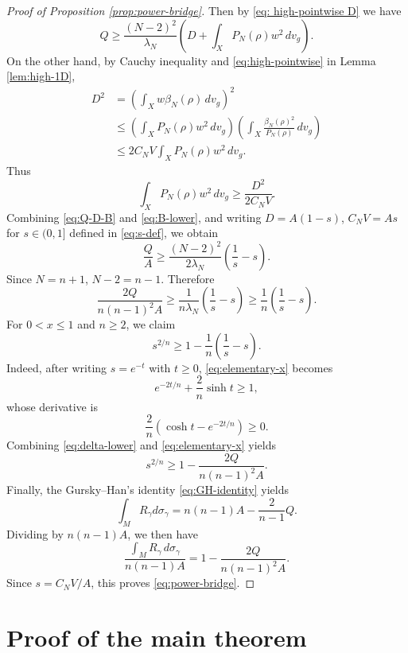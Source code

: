 \documentclass[11pt,letterpaper]{amsart}
\theoremstyle{definition}
\theoremstyle{remark}
\numberwithin{equation}{section}
\begin{document}
\begin{proof}[Proof of Proposition \ref{prop:power-bridge}]
Then by \eqref{eq: high-pointwise D} we have
\begin{equation}\label{eq:Q-D-B}
 Q\ge\frac{(N-2)^2}{\lambda_N}
 \left(D+\int_XP_N(\rho)w^2\,dv_g\right).
\end{equation}
On the other hand, by Cauchy inequality and \eqref{eq:high-pointwise} in Lemma \ref{lem:high-1D},
\begin{align*}
 D^2
 &=\left(\int_Xw\beta_N(\rho)\,dv_g\right)^2\\
 &\le\left(\int_XP_N(\rho)w^2\,dv_g\right)
    \left(\int_X\frac{\beta_N(\rho)^2}{P_N(\rho)}\,dv_g\right)\\
 &\le 2C_NV\int_XP_N(\rho)w^2\,dv_g.
\end{align*}
Thus
\begin{equation}\label{eq:B-lower}
 \int_XP_N(\rho)w^2\,dv_g\ge\frac{D^2}{2C_NV}.
\end{equation}
Combining \eqref{eq:Q-D-B} and \eqref{eq:B-lower}, and writing $D=A(1-s)$, $C_NV=As$ for $s\in (0, 1]$ defined in \eqref{eq:s-def}, we obtain
\begin{equation}\label{eq:Q-lower-x}
 \frac{Q}{A}
 \ge
 \frac{(N-2)^2}{2\lambda_N}\left(\frac1s-s\right).
\end{equation}
Since $N=n+1$, $N-2=n-1$.  Therefore
\begin{equation}\label{eq:delta-lower}
 \frac{2Q}{n(n-1)^2A}
 \ge
 \frac1{n\lambda_N}\left(\frac1s-s\right)
 \ge
 \frac1n\left(\frac1s-s\right).
\end{equation}
For $0<x\le1$ and $n\ge2$, we claim
\begin{equation}\label{eq:elementary-x}
 s^{2/n}\ge1-\frac1n\left(\frac1s-s\right).
\end{equation}
Indeed, after writing $s=e^{-t}$ with $t\geq 0$, \eqref{eq:elementary-x} becomes
\[
 e^{-2t/n}+\frac2n\sinh t\ge1,
\]
whose derivative is 
\[
\frac2n(\cosh t-e^{-2t/n})\ge0.
\]
Combining \eqref{eq:delta-lower} and \eqref{eq:elementary-x} yields
\[
 s^{2/n}\ge1-\frac{2Q}{n(n-1)^2A}.
\]
Finally, the Gursky--Han's identity \eqref{eq:GH-identity} yields
\[
\int_M R_\gamma d \sigma_\gamma=n(n-1) A-\frac{2}{n-1} Q.
\]
Dividing by $n(n-1)A$, we then have
\[
 \frac{\int_MR_\gamma\,d\sigma_\gamma}{n(n-1)A}=1-\frac{2Q}{n(n-1)^2A}.
\]
Since $s=C_N V/A$, this proves \eqref{eq:power-bridge}.
\end{proof}

\section{Proof of the main theorem}\label{sec:main-proof}
\end{document}
